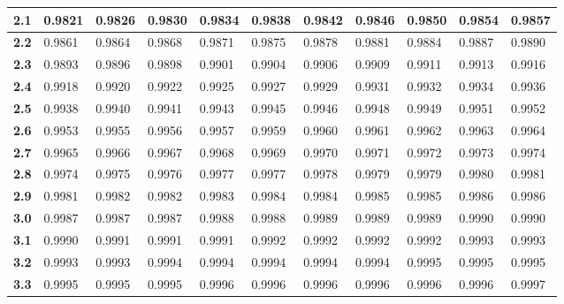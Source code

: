 \begin{longtable}{|l|l|l|l|l|l|l|l|l|l|l|}
    \textbf{2.1}  & 0.9821  & 0.9826  & 0.9830  & 0.9834  & 0.9838  & 0.9842  & 0.9846  & 0.9850  & 0.9854  & 0.9857\\ \hline
    
    \textbf{2.2}  & 0.9861  & 0.9864  & 0.9868  & 0.9871  & 0.9875  & 0.9878  & 0.9881  & 0.9884  & 0.9887  & 0.9890\\ \hline
    
    \textbf{2.3}  & 0.9893  & 0.9896  & 0.9898  & 0.9901  & 0.9904  & 0.9906  & 0.9909  & 0.9911  & 0.9913  & 0.9916\\ \hline
    
    \textbf{2.4}  & 0.9918  & 0.9920  & 0.9922  & 0.9925  & 0.9927  & 0.9929  & 0.9931  & 0.9932  & 0.9934  & 0.9936\\ \hline
    
    \textbf{2.5}  & 0.9938  & 0.9940  & 0.9941  & 0.9943  & 0.9945  & 0.9946  & 0.9948  & 0.9949  & 0.9951  & 0.9952\\ \hline
    
    \textbf{2.6}  & 0.9953  & 0.9955  & 0.9956  & 0.9957  & 0.9959  & 0.9960  & 0.9961  & 0.9962  & 0.9963  & 0.9964\\ \hline
    
    \textbf{2.7}  & 0.9965  & 0.9966  & 0.9967  & 0.9968  & 0.9969  & 0.9970  & 0.9971  & 0.9972  & 0.9973  & 0.9974\\ \hline
    
    \textbf{2.8}  & 0.9974  & 0.9975  & 0.9976  & 0.9977  & 0.9977  & 0.9978  & 0.9979  & 0.9979  & 0.9980  & 0.9981\\ \hline
    
    \textbf{2.9}  & 0.9981  & 0.9982  & 0.9982  & 0.9983  & 0.9984  & 0.9984  & 0.9985  & 0.9985  & 0.9986  & 0.9986\\ \hline
    
    \textbf{3.0}  & 0.9987  & 0.9987  & 0.9987  & 0.9988  & 0.9988  & 0.9989  & 0.9989  & 0.9989  & 0.9990  & 0.9990\\ \hline
    
    \textbf{3.1}  & 0.9990  & 0.9991  & 0.9991  & 0.9991  & 0.9992  & 0.9992  & 0.9992  & 0.9992  & 0.9993  & 0.9993\\ \hline
    
    \textbf{3.2}  & 0.9993  & 0.9993  & 0.9994  & 0.9994  & 0.9994  & 0.9994  & 0.9994  & 0.9995  & 0.9995  & 0.9995\\ \hline
    
    \textbf{3.3}  & 0.9995  & 0.9995  & 0.9995  & 0.9996  & 0.9996  & 0.9996  & 0.9996  & 0.9996  & 0.9996  & 0.9997\\ \hline
    

\end{longtable}
